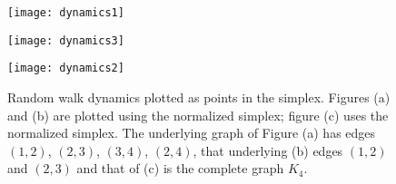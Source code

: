 \begin{figure}
	\centering
	\begin{minipage}{0.32\textwidth}
		\centering
		\texttt{[image: dynamics1]}
		\subcaption{}
	\end{minipage}
	\begin{minipage}{0.32\textwidth}
		\centering
		\texttt{[image: dynamics3]}
		\subcaption{}
	\end{minipage}
	\begin{minipage}{0.32\textwidth}
		\centering
		\texttt{[image: dynamics2]}
		\subcaption{}
	\end{minipage}
	\caption{Random walk dynamics plotted as points  in the simplex. Figures (a) and (b) are plotted using the normalized simplex;  figure (c) uses  the normalized simplex. The  underlying graph of Figure (a) has edges $(1,2)$, $(2,3)$, $(3,4)$, $(2,4)$, that underlying (b) edges $(1,2)$ and $(2,3)$ and that of (c) is the complete graph  $K_4$. }
	\label{fig:random_walk}
\end{figure}

